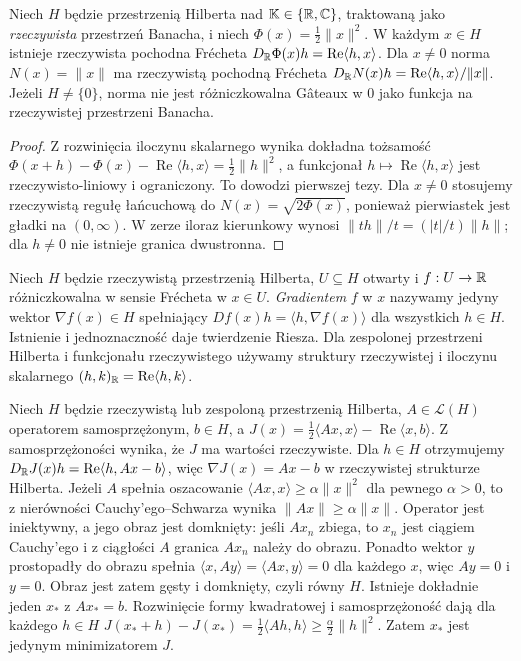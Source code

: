 \begin{twierdzenie}
\label{thm:hilbert-norm14}
Niech $H$ będzie przestrzenią Hilberta nad $\mathbb K\in\{\mathbb R,\mathbb C\}$, traktowaną jako \emph{rzeczywista} przestrzeń Banacha, i niech $\Phi(x)=\frac12\|x\|^2$. W każdym $x\in H$ istnieje rzeczywista pochodna Frécheta $D_{\mathbb R}\Phi(x)h=\operatorname{Re}\langle h,x\rangle$. Dla $x\ne0$ norma $N(x)=\|x\|$ ma rzeczywistą pochodną Frécheta
$D_{\mathbb R}N(x)h=\operatorname{Re}\langle h,x\rangle/\|x\|$.
Jeżeli $H\ne\{0\}$, norma nie jest różniczkowalna Gâteaux w $0$ jako funkcja na rzeczywistej przestrzeni Banacha.
\end{twierdzenie}
\begin{proof}
Z rozwinięcia iloczynu skalarnego wynika dokładna tożsamość
$\Phi(x+h)-\Phi(x)-\operatorname{Re}\langle h,x\rangle=\frac12\|h\|^2$, a funkcjonał $h\mapsto\operatorname{Re}\langle h,x\rangle$ jest rzeczywisto-liniowy i ograniczony. To dowodzi pierwszej tezy. Dla $x\ne0$ stosujemy rzeczywistą regułę łańcuchową do $N(x)=\sqrt{2\Phi(x)}$, ponieważ pierwiastek jest gładki na $(0,\infty)$. W zerze iloraz kierunkowy wynosi $\|th\|/t=(|t|/t)\|h\|$; dla $h\ne0$ nie istnieje granica dwustronna.
\end{proof}

\begin{definicja}
\label{def:gradient14}
Niech $H$ będzie rzeczywistą przestrzenią Hilberta, $U\subseteq H$ otwarty i $f:U\to\mathbb R$ różniczkowalna w sensie Frécheta w $x\in U$. \emph{Gradientem} $f$ w $x$ nazywamy jedyny wektor $\nabla f(x)\in H$ spełniający $Df(x)h=\langle h,\nabla f(x)\rangle$ dla wszystkich $h\in H$. Istnienie i jednoznaczność daje twierdzenie Riesza. Dla zespolonej przestrzeni Hilberta i funkcjonału rzeczywistego używamy struktury rzeczywistej i iloczynu skalarnego $(h,k)_{\mathbb R}=\operatorname{Re}\langle h,k\rangle$.
\end{definicja}

\begin{przyklad}
\label{ex:quadratic-energy14}
Niech $H$ będzie rzeczywistą lub zespoloną przestrzenią Hilberta, $A\in\mathcal L(H)$ operatorem samosprzężonym, $b\in H$, a $J(x)=\frac12\langle Ax,x\rangle-\operatorname{Re}\langle x,b\rangle$. Z samosprzężoności wynika, że $J$ ma wartości rzeczywiste. Dla $h\in H$ otrzymujemy
$D_{\mathbb R}J(x)h=\operatorname{Re}\langle h,Ax-b\rangle$, więc $\nabla J(x)=Ax-b$ w rzeczywistej strukturze Hilberta. Jeżeli $A$ spełnia oszacowanie $\langle Ax,x\rangle\ge\alpha\|x\|^2$ dla pewnego $\alpha>0$, to z nierówności Cauchy'ego--Schwarza wynika $\|Ax\|\ge\alpha\|x\|$. Operator jest iniektywny, a jego obraz jest domknięty: jeśli $Ax_n$ zbiega, to $x_n$ jest ciągiem Cauchy'ego i z ciągłości $A$ granica $Ax_n$ należy do obrazu. Ponadto wektor $y$ prostopadły do obrazu spełnia $\langle x,Ay\rangle=\langle Ax,y\rangle=0$ dla każdego $x$, więc $Ay=0$ i $y=0$. Obraz jest zatem gęsty i domknięty, czyli równy $H$. Istnieje dokładnie jeden $x_*$ z $Ax_*=b$. Rozwinięcie formy kwadratowej i samosprzężoność dają dla każdego $h\in H$
$J(x_*+h)-J(x_*)=\frac12\langle Ah,h\rangle\ge\frac\alpha2\|h\|^2$.
Zatem $x_*$ jest jedynym minimizatorem $J$.
\end{przyklad}


